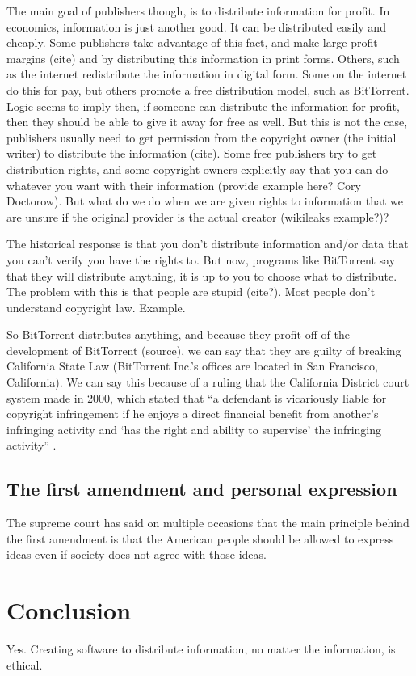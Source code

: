 \documentclass[11pt]{article}
\begin{document}
The main goal of publishers though, is to distribute information for profit. In economics, information is just another good. It can be distributed easily and cheaply. Some publishers take advantage of this fact, and make large profit margins (cite) and by distributing this information in print forms. Others, such as the internet redistribute the information in digital form. Some on the internet do this for pay, but others promote a free distribution model, such as BitTorrent. Logic seems to imply then, if someone can distribute the information for profit, then they should be able to give it away for free as well. But this is not the case, publishers usually need to get permission from the copyright owner (the initial writer) to distribute the information (cite). Some free publishers try to get distribution rights, and some copyright owners explicitly say that you can do whatever you want with their information (provide example here? Cory Doctorow). But what do we do when we are given rights to information that we are unsure if the original provider is the actual creator (wikileaks example?)?

The historical response is that you don't distribute information and/or data that you can't verify you have the rights to. But now, programs like BitTorrent say that they will distribute anything, it is up to you to choose what to distribute. The problem with this is that people are stupid (cite?). Most people don't understand copyright law. Example.

So BitTorrent distributes anything, and because they profit off of the development of BitTorrent (source), we can say that they are guilty of breaking California State Law (BitTorrent Inc.'s offices are located in San Francisco, California). We can say this because of a ruling that the California District court system made in 2000, which stated that ``a defendant is vicariously liable for copyright infringement if he enjoys a direct financial benefit from another's infringing activity and `has the right and ability to supervise' the infringing activity'' \cite{2000m}.

\subsection{The first amendment and personal expression}

The supreme court has said on multiple occasions that the main principle behind the first amendment is that the American people should be allowed to express ideas even if society does not agree with those ideas. 

\section{Conclusion}
Yes. Creating software to distribute information, no matter the information, is ethical.

\newpage


\end{document}
